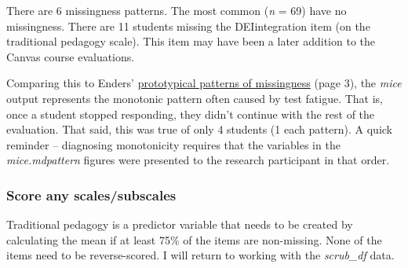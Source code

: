 \documentclass[
  11pt,
]{book}
\newenvironment{Shaded}{\begin{snugshade}}{\end{snugshade}}
\newcommand{\CommentTok}[1]{\textcolor[rgb]{0.37,0.37,0.37}{\textit{#1}}}
\newcommand{\FloatTok}[1]{\textcolor[rgb]{0.06,0.06,0.06}{#1}}
\newcommand{\FunctionTok}[1]{\textcolor[rgb]{0.27,0.27,0.27}{\textbf{#1}}}
\newcommand{\NormalTok}[1]{#1}
\newcommand{\OtherTok}[1]{\textcolor[rgb]{0.37,0.37,0.37}{#1}}
\newcommand{\SpecialCharTok}[1]{\textcolor[rgb]{0.43,0.43,0.43}{\textbf{#1}}}
\newcommand{\StringTok}[1]{\textcolor[rgb]{0.5,0.5,0.5}{#1}}
\begin{document}
There are 6 missingness patterns. The most common (\emph{n} = 69) have no missingness. There are 11 students missing the DEIintegration item (on the traditional pedagogy scale). This item may have been a later addition to the Canvas course evaluations.

Comparing this to Enders' \citeyearpar{enders_applied_2010} \href{https://www.google.com/books/edition/Applied_Missing_Data_Analysis/uHt4EAAAQBAJ?hl=en\&gbpv=1\&dq=enders+missing+data\&pg=PP1\&printsec=frontcover}{prototypical patterns of missingness} (page 3), the \emph{mice} output represents the monotonic pattern often caused by test fatigue. That is, once a student stopped responding, they didn't continue with the rest of the evaluation. That said, this was true of only 4 students (1 each pattern). A quick reminder -- diagnosing monotonicity requires that the variables in the \emph{mice.mdpattern} figures were presented to the research participant in that order.

\hypertarget{score-any-scalessubscales}{%
\subsubsection*{Score any scales/subscales}\label{score-any-scalessubscales}}


Traditional pedagogy is a predictor variable that needs to be created by calculating the mean if at least 75\% of the items are non-missing. None of the items need to be reverse-scored. I will return to working with the \emph{scrub\_df} data.

\begin{Shaded}
\end{Shaded}
\end{document}
